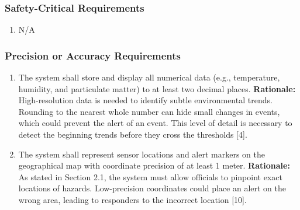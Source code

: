\documentclass[]{article}
\begin{document}
\subsubsection{Safety-Critical Requirements}
\label{ssub:safety_critical_requirements}
\begin{enumerate}[{PR-SC}1. ]
	\item N/A
\end{enumerate}

\subsubsection{Precision or Accuracy Requirements}
\label{ssub:precision_or_accuracy_requirements}
\begin{enumerate}[{PR-PA}1. ]
	\item The system shall store and display all numerical data (e.g., temperature, humidity, and particulate matter) to at least two decimal places.\newline
	{\bf Rationale:} High-resolution data is needed to identify subtle environmental trends. Rounding to the nearest whole number can hide small changes in events, which could prevent the alert of an event. This level of detail is necessary to detect the beginning trends before they cross the thresholds [4].
	\item The system shall represent sensor locations and alert markers on the geographical map with coordinate precision of at least 1 meter.\newline
	{\bf Rationale:} As stated in Section 2.1, the system must allow officials to pinpoint exact locations of hazards. Low-precision coordinates could place an alert on the wrong area, leading to responders to the incorrect location [10].
\end{enumerate}
\end{document}
